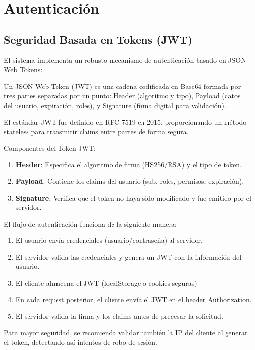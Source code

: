 \section{Autenticación}

\subsection{Seguridad Basada en Tokens (JWT)}

El sistema implementa un robusto mecanismo de autenticación basado en JSON Web Tokens:

Un JSON Web Token (JWT) es una cadena codificada en Base64 formada por tres partes separadas por un punto: Header (algoritmo y tipo), Payload (datos del usuario, expiración, roles), y Signature (firma digital para validación).

El estándar JWT fue definido en RFC 7519 en 2015, proporcionando un método stateless para transmitir claims entre partes de forma segura.

Componentes del Token JWT:

\begin{enumerate}
\item \textbf{Header}: Especifica el algoritmo de firma (HS256/RSA) y el tipo de token.
\item \textbf{Payload}: Contiene los claims del usuario (sub, roles, permisos, expiración).
\item \textbf{Signature}: Verifica que el token no haya sido modificado y fue emitido por el servidor.
\end{enumerate}

El flujo de autenticación funciona de la siguiente manera:

\begin{enumerate}
\item El usuario envía credenciales (usuario/contraseña) al servidor.
\item El servidor valida las credenciales y genera un JWT con la información del usuario.
\item El cliente almacena el JWT (localStorage o cookies seguras).
\item En cada request posterior, el cliente envía el JWT en el header Authorization.
\item El servidor valida la firma y los claims antes de procesar la solicitud.
\end{enumerate}

Para mayor seguridad, se recomienda validar también la IP del cliente al generar el token, detectando así intentos de robo de sesión.

